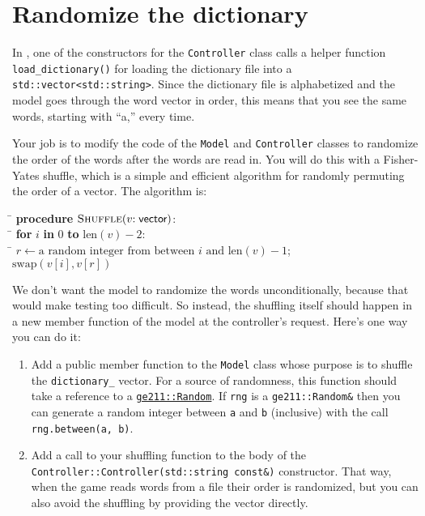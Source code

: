 \documentclass{tufte-handout}
\begin{document}
\section{Randomize the dictionary}

In , one of the constructors for the
\verb^Controller^ class calls a helper function \verb!load_dictionary()!
for loading the dictionary file into a \verb!std::vector<std::string>!.
Since the dictionary file is alphabetized and the model goes through the
word vector in order, this means that you see the same words, starting
with ``a,'' every time.

Your job is to modify the code of the \verb^Model^ and \verb^Controller^
classes to randomize the order of the words after the words are read in.
You will do this with a Fisher-Yates shuffle, which is a simple and
efficient algorithm for randomly permuting the order of a vector. The
algorithm is:

{
\sffamily
\begin{tabbing}
\qquad\=\+
  \textbf{procedure} $\textsc{Shuffle}(v{:}\;\textsf{vector})$: \\
\qquad\=\+
  \textbf{for} $i$ \textbf{in} $0$
        \textbf{to} $\mathrm{len}(v) - 2$: \\
\qquad\=\+
  $r \gets \textrm{a random integer from between $i$ and $\mathrm{len}(v) - 1$}$; \\
  $\mathrm{swap}(v[i], v[r])$
\end{tabbing}
}

We don't want the model to randomize the words unconditionally, because
that would make testing too difficult. So instead, the shuffling itself
should happen in a new member function of the model at the controller's
request. Here's one way you can do it:

\begin{enumerate}

  \item Add a public member function to the \verb^Model^ class whose
    purpose is to shuffle the \verb^dictionary_^ vector. For a source of
    randomness, this function should take a reference to a
    \href{https://tov.github.io/ge211/classge211_1_1_random.html}
    {\texttt{ge211::Random}}. If \verb^rng^ is a \verb^ge211::Random&^
    then you can generate a random integer between \verb^a^ and \verb^b^
    (inclusive) with the call \verb^rng.between(a, b)^.

  \item Add a call to your shuffling function to the body of the
    \texttt{Controller::\-Controller(std::string const\&)} constructor.
    That way, when the game reads words from a file their order is
    randomized, but you can also avoid the shuffling by providing the
    vector directly.

\end{enumerate}
\end{document}
